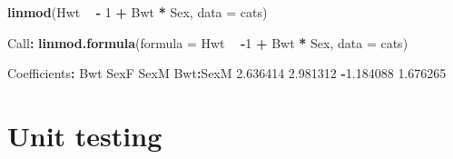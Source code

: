 \documentclass[]{book}
\newenvironment{Shaded}{\begin{snugshade}}{\end{snugshade}}
\newcommand{\KeywordTok}[1]{\textcolor[rgb]{0.13,0.29,0.53}{\textbf{#1}}}
\newcommand{\DataTypeTok}[1]{\textcolor[rgb]{0.13,0.29,0.53}{#1}}
\newcommand{\DecValTok}[1]{\textcolor[rgb]{0.00,0.00,0.81}{#1}}
\newcommand{\FloatTok}[1]{\textcolor[rgb]{0.00,0.00,0.81}{#1}}
\newcommand{\StringTok}[1]{\textcolor[rgb]{0.31,0.60,0.02}{#1}}
\newcommand{\ControlFlowTok}[1]{\textcolor[rgb]{0.13,0.29,0.53}{\textbf{#1}}}
\newcommand{\OperatorTok}[1]{\textcolor[rgb]{0.81,0.36,0.00}{\textbf{#1}}}
\newcommand{\NormalTok}[1]{#1}
\theoremstyle{definition}
\theoremstyle{definition}
\theoremstyle{definition}
\theoremstyle{remark}
\begin{document}
\begin{Shaded}
\end{Shaded}

\begin{Shaded}
\begin{Highlighting}[]
\KeywordTok{linmod}\NormalTok{(Hwt }\OperatorTok{~}\StringTok{ }\OperatorTok{-}\StringTok{ }\DecValTok{1} \OperatorTok{+}\StringTok{ }\NormalTok{Bwt }\OperatorTok{*}\StringTok{ }\NormalTok{Sex, }\DataTypeTok{data =}\NormalTok{ cats)}
\end{Highlighting}
\end{Shaded}

\begin{Shaded}
\begin{Highlighting}[]
\NormalTok{Call}\OperatorTok{:}
\KeywordTok{linmod.formula}\NormalTok{(}\DataTypeTok{formula =}\NormalTok{ Hwt }\OperatorTok{~}\StringTok{ }\OperatorTok{-}\DecValTok{1} \OperatorTok{+}\StringTok{ }\NormalTok{Bwt }\OperatorTok{*}\StringTok{ }\NormalTok{Sex, }\DataTypeTok{data =}\NormalTok{ cats)}

\NormalTok{Coefficients}\OperatorTok{:}
\StringTok{      }\NormalTok{Bwt      SexF      SexM  Bwt}\OperatorTok{:}\NormalTok{SexM }
 \FloatTok{2.636414}  \FloatTok{2.981312} \OperatorTok{-}\FloatTok{1.184088}  \FloatTok{1.676265} 
\end{Highlighting}
\end{Shaded}

\section{Unit testing}\label{unit-testing}
\end{document}
